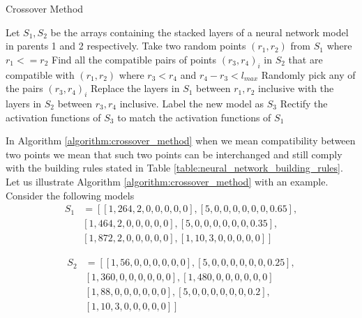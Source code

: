 \documentclass[journal]{IEEEtran}
\begin{document}
\begin{algorithm}[!htb]
\caption{Crossover Method}
\begin{algorithmic}
\State Let $S_1, S_2$ be the arrays containing the stacked layers of a neural network model in parents 1 and 2 respectively.
\State Take two random points $(r_1, r_2)$ from $S_1$ where $r_1 <= r_2 $
\Else 
\EndIf
\State Find all the compatible pairs of points $(r_3, r_4)_i$ in $S_2$ that are compatible with $(r_1, r_2)$ where $r_3 < r_4$ and $r_4 - r_3 < l_{max}$
\State Randomly pick any of the pairs $(r_3, r_4)_i$
\State Replace the layers in $S_1$ between $r_1, r_2$ inclusive with the layers in $S_2$ between $r_3, r_4$ inclusive. Label the new model as $S_3$
\State Rectify the activation functions of $S_3$ to match the activation functions of $S_1$
\end{algorithmic}
\label{algorithm:crossover_method}
\end{algorithm}

In Algorithm \ref{algorithm:crossover_method} when we mean compatibility between two points we mean that such two points can be interchanged and still comply with the building rules stated in Table \ref{table:neural_network_building_rules}. Let us illustrate Algorithm \ref{algorithm:crossover_method} with an example. Consider the following models\\

\begin{align*}
S_1 & = \left[ \left[1, 264, 2, 0, 0, 0, 0, 0 \right], \left[5, 0, 0, 0, 0, 0, 0, 0.65 \right], \right. \\
& \left. \left[1, 464, 2, 0, 0, 0, 0, 0 \right], \left[5, 0, 0, 0, 0, 0, 0, 0.35 \right], \right. \\
& \left. \left[1, 872, 2, 0, 0, 0, 0, 0 \right], \left[1, 10, 3, 0, 0, 0, 0, 0 \right] \right]
\end{align*}

\begin{align*}
S_2 & = \left[ \left[1, 56, 0, 0, 0, 0, 0, 0 \right], \left[5, 0, 0, 0, 0, 0, 0, 0.25 \right], \right. \\
&  \left. \left[1, 360, 0, 0, 0, 0, 0, 0 \right], \left[1, 480, 0, 0, 0, 0, 0, 0 \right] \right. \\
&  \left. \left[1, 88, 0, 0, 0, 0, 0, 0 \right], \left[5, 0, 0, 0, 0, 0, 0, 0.2 \right], \right. \\
&  \left. \left[1, 10, 3, 0, 0, 0, 0, 0 \right] \right]
\end{align*}
\end{document}
